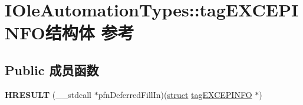 \hypertarget{struct_i_ole_automation_types_1_1tag_e_x_c_e_p_i_n_f_o}{}\section{I\+Ole\+Automation\+Types\+:\+:tag\+E\+X\+C\+E\+P\+I\+N\+F\+O结构体 参考}
\label{struct_i_ole_automation_types_1_1tag_e_x_c_e_p_i_n_f_o}
\subsection*{Public 成员函数}
\begin{DoxyCompactItemize}
\item 
\mbox{\label{struct_i_ole_automation_types_1_1tag_e_x_c_e_p_i_n_f_o_a1fe3feebb4417de02648eeaa2729a4b3}} 
{\bfseries H\+R\+E\+S\+U\+LT} (\+\_\+\+\_\+stdcall $\ast$pfn\+Deferred\+Fill\+In)(\hyperlink{interfacestruct}{struct} \hyperlink{struct_i_ole_automation_types_1_1tag_e_x_c_e_p_i_n_f_o}{tag\+E\+X\+C\+E\+P\+I\+N\+FO} $\ast$)
\end{DoxyCompactItemize}
